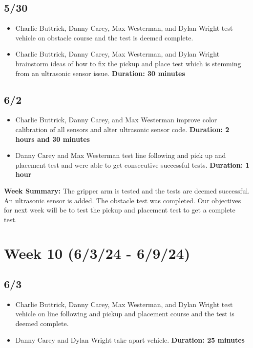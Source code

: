\documentclass[12pt]{report}
\begin{document}
\subsection*{5/30}

\begin{itemize}
    \item Charlie Buttrick, Danny Carey, Max Westerman, and Dylan Wright test vehicle on obstacle course and the test is deemed complete.
    \item Charlie Buttrick, Danny Carey, Max Westerman, and Dylan Wright brainstorm ideas of how to fix the pickup and place test which is stemming from an ultrasonic sensor issue. \textbf{Duration: 30 minutes}
\end{itemize}

\subsection*{6/2}

\begin{itemize}
    \item Charlie Buttrick, Danny Carey, and Max Westerman improve color calibration of all sensors and alter ultrasonic sensor code. \textbf{Duration: 2 hours and 30 minutes}
    \item Danny Carey and Max Westerman test line following and pick up and placement test and were able to get consecutive successful tests. \textbf{Duration: 1 hour}
\end{itemize}

\textbf{Week Summary:} The gripper arm is tested and the tests are deemed successful. An ultrasonic sensor is added. The obstacle test was completed. Our objectives for next week will be to test the pickup and placement test to get a complete test.

\section{Week 10 (6/3/24 - 6/9/24)}
\subsection*{6/3}

\begin{itemize}
    \item Charlie Buttrick, Danny Carey, Max Westerman, and Dylan Wright test vehicle on line following and pickup and placement course and the test is deemed complete.
    \item Danny Carey and Dylan Wright take apart vehicle. \textbf{Duration: 25 minutes}
\end{itemize}


\SectionuseNormalSectionSizing
\SubSectionuseNormalSectionSizing
\end{document}
